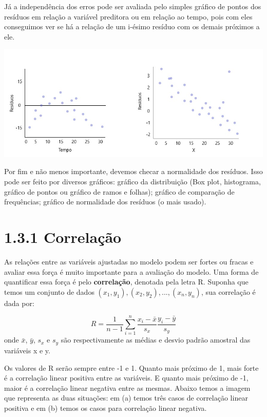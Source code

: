 \documentclass[
]{article}
\begin{document}
Já a independência dos erros pode ser avaliada pelo simples gráfico de
pontos dos resíduos em relação a variável preditora ou em relação ao
tempo, pois com eles conseguimos ver se há a relação de um i-ésimo
resíduo com os demais próximos a ele.

\includegraphics{images/residuos5.JPG}

Por fim e não menos importante, devemos checar a normalidade dos
resíduos. Isso pode ser feito por diversos gráficos: gráfico da
distribuição (Box plot, histograma, gráfico de pontos ou gráfico de
ramos e folhas); gráfico de comparação de frequências; gráfico de
normalidade dos resíduos (o mais usado).

\hypertarget{correlauxe7uxe3o}{%
\section{1.3.1 Correlação}\label{correlauxe7uxe3o}}

As relações entre as variáveis ajustadas no modelo podem ser fortes ou
fracas e avaliar essa força é muito importante para a avaliação do
modelo. Uma forma de quantificar essa força é pelo \textbf{correlação},
denotada pela letra R. Suponha que temos um conjunto de dados
\((x_1,y_1),(x_2,y_2),...,(x_n,y_n)\), sua correlação é dada por:

\[R = \frac{1}{n-1}\sum_{i=1}^{n} \frac{x_i-\bar{x}}{s_x} \frac{y_i-\bar{y}}{s_y}\]
onde \(\bar{x}\), \(\bar{y}\), \({s_x}\) e \({s_y}\) são respectivamente
as médias e desvio padrão amostral das variáveis x e y.

Os valores de R serão sempre entre -1 e 1. Quanto mais próximo de 1,
mais forte é a correlação linear positiva entre as variáveis. E quanto
mais próximo de -1, maior é a correlação linear negativa entre as
mesmas. Abaixo temos a imagem que representa as duas situações: em (a)
temos três casos de correlação linear positiva e em (b) temos os casos
para correlação linear negativa.
\end{document}

